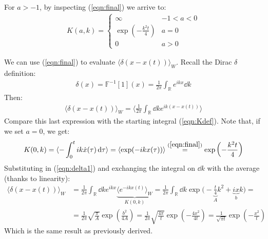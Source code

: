 \documentclass[../template.tex]{subfiles}
\begin{document}
\begin{exo}
    For $a > -1$, by inspecting (\ref{eqn:final}) we arrive to:
    \begin{align*}
        K(a,k) = \begin{cases}
            \infty & -1 < a < 0\\
            \exp\left(-\frac{k^2 t}{4} \right) & a = 0\\
            0 & a > 0
        \end{cases}
    \end{align*}

    We can use (\ref{eqn:final}) to evaluate $\langle \delta(x-x(t)) \rangle_W$. Recall the Dirac $\delta$ definition:
    \begin{align*}
        \delta(x) = \mathbb{F}^{-1}[1](x) = \frac{1}{2 \pi} \int_{\mathbb{R}} e^{ikx} \dd{k}  
    \end{align*}
    Then:
    \begin{align}
        \langle \delta(x-x(t)) \rangle_W = \langle \frac{1}{2\pi} \int_{\mathbb{R}} \dd{k} e^{ik(x-x(t))}  \rangle \label{eqn:delta1}
    \end{align}
    Compare this last expression with the starting integral (\ref{eqn:Kdef}). Note that, if we set $a=0$, we get:
    \begin{align*}
        K(0,k) = \langle- \int_0^t ik \dot{x}(\tau) \dd{\tau} \rangle = \langle \exp(-ik x(\tau)) \rangle \overset{(\ref{eqn:final})}{=} \exp\left(-\frac{k^2 t}{4} \right)
    \end{align*}
    Substituting in (\ref{eqn:delta1}) and exchanging the integral on $\dd{k}$ with the average (thanks to linearity):
    \begin{align*}
        \langle \delta(x-x(t)) \rangle_W &= \frac{1}{2 \pi} \int_{\mathbb{R}} \dd{k} e^{ikx} \underbrace{\langle e^{-ikx(t)} \rangle_W}_{K(0,k)} = \frac{1}{2 \pi} \int_{\mathbb{R}} \dd{k} \exp\Bigg(-\underbrace{\frac{t}{4}}_{A} k^2 +\underbrace{ix}_{b}k\Bigg) =\\
        &= \frac{1}{2 \pi} \sqrt{\frac{\pi}{A} }\exp\left(\frac{b^2}{4A}  \right) = \frac{1}{2\pi} \sqrt{\frac{4\pi}{t} } \exp\left(-\frac{4x^2}{4t} \right) =\frac{1}{\sqrt{\pi t}} \exp\left(-\frac{x^2}{t} \right)
    \end{align*}
    Which is the same result as previously derived.
\end{exo}
\end{document}
